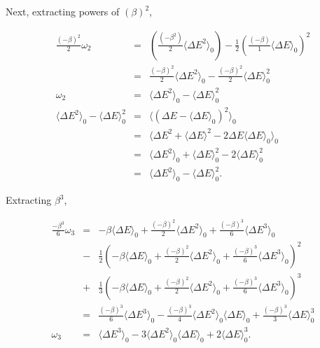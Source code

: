 Next, extracting powers of $(\beta)^2$,

\begin{eqnarray}
\ \frac{(-\beta)^2}{2} \omega_2 &=& \left( \frac{(-\beta^2)}{2} \langle \Delta E^2 \rangle_0 \right) - \frac{1}{2}\left( \frac{(-\beta)}{1} \langle \Delta E \rangle_0 \right)^2 \\
\ &=& \frac{(-\beta)^2}{2}\langle \Delta E^2 \rangle_0 - \frac{(-\beta)^2}{2}\langle \Delta E \rangle_0^2 \\
\ \omega_2 &=& \langle \Delta E^2 \rangle_0 - \langle \Delta E \rangle_0^2 \\
\ \langle \Delta E^2 \rangle_0 - \langle \Delta E \rangle_0^2 &=& \langle (\Delta E - \langle \Delta E \rangle_0 )^2 \rangle_0 \\
\ &=& \langle \Delta E^2 + \langle \Delta E \rangle^2 - 2 \Delta E \langle \Delta E \rangle_0 \rangle_0 \\
\ &=& \langle \Delta E^2 \rangle_0 + \langle \Delta E \rangle^2_0 - 2 \langle \Delta E \rangle^2_0 \\
\ &=& \langle \Delta E^2 \rangle_0 - \langle \Delta E \rangle_0^2 .
\end{eqnarray}

Extracting $\beta^3$,

\begin{eqnarray}
\ \frac{-\beta^3}{6} \omega_3 &=& -\beta \langle \Delta E \rangle_0 + \frac{(-\beta)^2}{2} \langle \Delta E^2 \rangle_0 + \frac{(-\beta)^3}{6} \langle \Delta E^3 \rangle_0 \nonumber \\ 
\ &-& \frac{1}{2} \left( -\beta \langle \Delta E \rangle_0 + \frac{(-\beta)^2}{2} \langle \Delta E^2 \rangle_0 + \frac{(-\beta)^3}{6} \langle \Delta E^3 \rangle_0  \right)^2 \nonumber \\
\ &+& \frac{1}{3} \left( -\beta \langle \Delta E \rangle_0 + \frac{(-\beta)^2}{2} \langle \Delta E^2 \rangle_0 + \frac{(-\beta)^3}{6}\langle \Delta E^3 \rangle_0 \right)^3 \\
\ &=& \frac{(-\beta)^3}{6} \langle \Delta E^3 \rangle_0 - \frac{(-\beta)^3}{4} \langle \Delta E^2 \rangle_0 \langle \Delta E \rangle_0 + \frac{(-\beta)^3}{3} \langle \Delta E \rangle_0^3 \\
\ \omega_3 &=& \langle \Delta E^3 \rangle_0 -3 \langle \Delta E^2 \rangle_0 \langle \Delta E \rangle_0 + 2 \langle \Delta E \rangle_0^3 .
\end{eqnarray}

